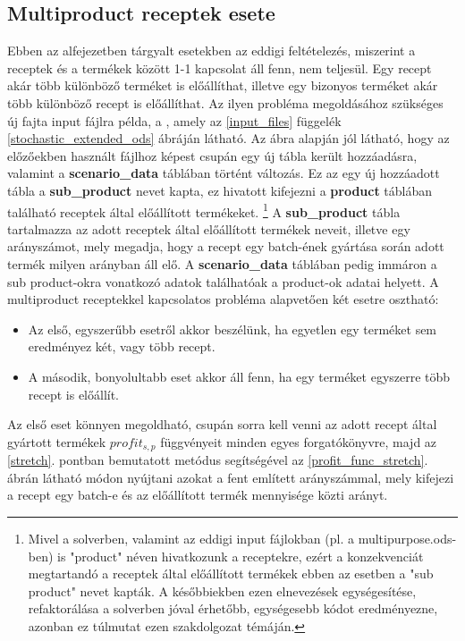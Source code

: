 \subsection{Multiproduct receptek esete} \label{extended_multiproduct}
Ebben az alfejezetben tárgyalt esetekben az eddigi feltételezés, miszerint a receptek és a termékek között 1-1 kapcsolat áll fenn, nem teljesül.
Egy recept akár több különböző terméket is előállíthat, illetve egy bizonyos terméket akár több különböző recept is előállíthat.
Az ilyen probléma megoldásához szükséges új fajta input fájlra példa, a , amely az \ref{input_files} függelék \ref{stochastic_extended_ods} ábráján látható.
Az ábra alapján jól látható, hogy az előzőekben használt  fájlhoz képest csupán egy új tábla került hozzáadásra, valamint a \textbf{scenario\_data} táblában történt változás.
Ez az egy új hozzáadott tábla a \textbf{sub\_product} nevet kapta, ez hivatott kifejezni a \textbf{product} táblában található receptek által előállított termékeket. \footnote{Mivel a solverben, valamint az eddigi input fájlokban (pl. a multipurpose.ods-ben) is "product" néven hivatkozunk a receptekre, ezért a konzekvenciát megtartandó a receptek által előállított termékek ebben az esetben a "sub product" nevet kapták. A későbbiekben ezen elnevezések egységesítése, refaktorálása a solverben jóval érhetőbb, egységesebb kódot eredményezne, azonban ez túlmutat ezen szakdolgozat témáján.}
A \textbf{sub\_product} tábla tartalmazza az adott receptek által előállított termékek neveit, illetve egy arányszámot, mely megadja, hogy a recept egy batch-ének gyártása során adott termék milyen arányban áll elő.
A \textbf{scenario\_data} táblában pedig immáron a sub product-okra vonatkozó adatok találhatóak a product-ok adatai helyett.
A multiproduct receptekkel kapcsolatos probléma alapvetően két esetre osztható:
\begin{itemize}
\item Az első, egyszerűbb esetről akkor beszélünk, ha egyetlen egy terméket sem eredményez két, vagy több recept.
\item A második, bonyolultabb eset akkor áll fenn, ha egy terméket egyszerre több recept is előállít.
\end{itemize}
Az első eset könnyen megoldható, csupán sorra kell venni az adott recept által gyártott termékek $profit_{s,p}$ függvényeit minden egyes forgatókönyvre, majd az \ref{stretch}. pontban bemutatott metódus segítségével az \ref{profit_func_stretch}. ábrán látható módon nyújtani azokat a fent említett arányszámmal, mely kifejezi a recept egy batch-e és az előállított termék mennyisége közti arányt.
